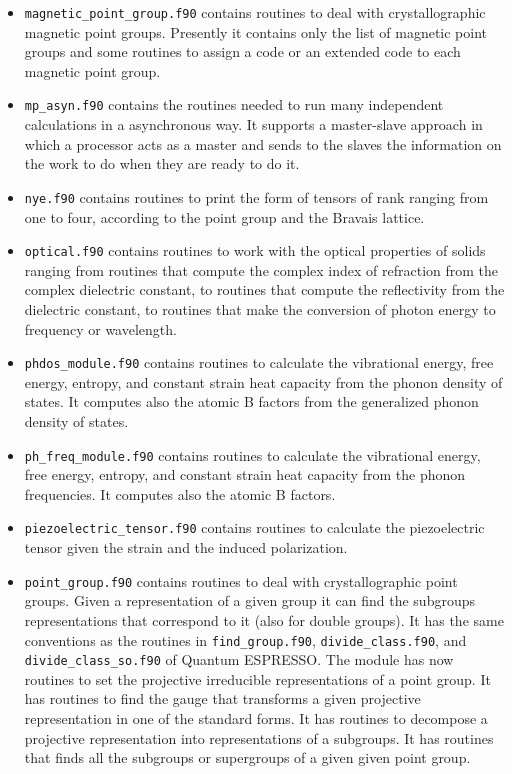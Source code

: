 \documentclass[12pt,a4paper,twoside]{report}
\def\qe{{\sc Quantum ESPRESSO}}
\begin{document}
\begin{itemize}
\item
\texttt{magnetic\_point\_group.f90} contains routines to deal with 
crystallographic
magnetic point groups. Presently it contains only the list of magnetic
point groups and some routines to assign a code or an extended code to each
magnetic point group.

\item
\texttt{mp\_asyn.f90} contains the routines needed to run many 
independent calculations in a asynchronous way. It supports a master-slave
approach in which a processor acts as a master and sends to the slaves
the information on the work to do when they are ready to do it.

\item
\texttt{nye.f90} contains routines to print the form of tensors of
rank ranging from one to four, according to the point group and the
Bravais lattice.

\item
\texttt{optical.f90} contains routines to work with the optical properties
of solids ranging from routines that compute the complex index of refraction
from the complex dielectric constant, to routines that compute the
reflectivity from the dielectric constant, to routines that make
the conversion of photon energy to frequency or wavelength.

\item
\texttt{phdos\_module.f90} contains routines to calculate the vibrational
energy, free energy, entropy, and constant strain heat capacity from the
phonon density of states. It computes also the atomic B factors from the
generalized phonon density of states.

\item
\texttt{ph\_freq\_module.f90} contains routines to calculate the vibrational
energy, free energy, entropy, and constant strain heat capacity from the
phonon frequencies. It computes also the atomic B factors.

\item
\texttt{piezoelectric\_tensor.f90} contains routines to calculate the
piezoelectric tensor given the strain and the induced polarization.

\item
\texttt{point\_group.f90} contains routines to deal with crystallographic
point groups. Given a representation of a given group it can find 
the subgroups representations that correspond to it (also for
double groups). It has the same conventions as the routines 
in \texttt{find\_group.f90}, \texttt{divide\_class.f90}, and 
\texttt{divide\_class\_so.f90} of \qe. The module has now routines to
set the projective irreducible representations of a point group.
It has routines to find the gauge that transforms a given projective
representation in one of the standard forms. It has routines to decompose
a projective representation into representations of a subgroups.
It has routines that finds all the subgroups or supergroups of a given given
point group.


\end{itemize}
\end{document}
